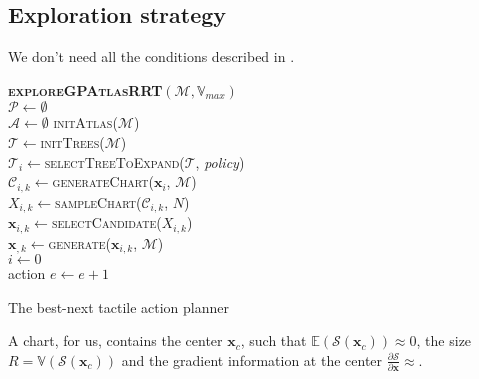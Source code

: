 \subsection{Exploration strategy}
\label{sec:strategy}

We don't need all the conditions described in \citet[Fig.~8]{Jaillet2013Path}.

\begin{algorithm}[h]
\textbf{\textsc{exploreGPAtlasRRT}}$(\mathcal{M}, \mathbb{V}_{max})$\\ %
\LinesNumbered
\DontPrintSemicolon
\SetAlgoVlined {} 
  $\mathcal{P} \leftarrow \emptyset$ \\
  $\mathcal{A} \leftarrow \emptyset$ \textsc{initAtlas}($\mathcal{M}$) \\
  $\mathcal{T} \leftarrow$\textsc{initTrees}($\mathcal{M}$) \\
  $\mathcal{T}_{i} \leftarrow$\textsc{selectTreeToExpand}($\mathcal{T}$, \emph{policy}) \\
  
  $\mathcal{C}_{i,k} \leftarrow$\textsc{generateChart}($\mathbf{x}_{i}$, $\mathcal{M}$) \\
  $X_{i,k} \leftarrow$\textsc{sampleChart}($\mathcal{C}_{i,k}$, $N$) \\
  $\mathbf{x}_{i,k} \leftarrow$\textsc{selectCandidate}($X_{i,k}$) \\
  $\mathbf{x}_{,k} \leftarrow$\textsc{generate}($\mathbf{x}_{i,k}$, $\mathcal{M}$) \\

  {
    $i \leftarrow 0$ \\
    {
      \Return action 
    }
    $e \leftarrow e + 1$ \\
  }
  \Return{$\varnothing$}

\caption{The best-next tactile action planner} \label{algo:strategy}
\end{algorithm}

A chart, for us, contains the center $\mathbf{x}_c$, such that $\mathbb{E}(\mathcal{S}(\mathbf{x}_c)) \approx 0$, the size $R = \mathbb{V}(\mathcal{S}(\mathbf{x}_c))$ and the gradient information at the center $\frac{\partial \mathcal{S}}{\partial \mathbf{x}} \approx $.

